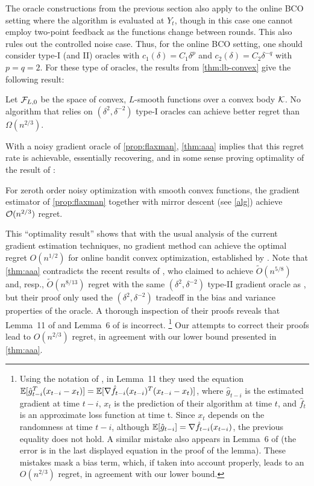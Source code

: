 The oracle constructions from the previous section also apply to the online BCO setting
where the algorithm is evaluated at $Y_t$, though in this case 
one cannot employ two-point feedback as the functions change between rounds. 
This also rules out the controlled noise case. 
Thus, for the online BCO setting, one should consider type-I (and II) oracles with $c_1(\delta) = C_1 \delta^p$ and $c_2(\delta) = C_2\delta^{-q}$ with $p=q=2$.
For these type of oracles, the results from \cref{thm:lb-convex} give the following result: 
\begin{theorem}\label{thm:aaa}
Let $\mathcal{F}_{L,0}$ be the space of convex, $L$-smooth functions over a convex body $\mathcal{K}$.
No algorithm that relies on 
 $(\delta^2,\delta^{-2})$ type-I oracles
 can achieve better regret than $\Omega(n^{2/3})$.
\end{theorem}
With a noisy gradient oracle of \cref{prop:flaxman}, \cref{thm:aaa} implies that this regret rate is achievable, essentially recovering, and in some sense proving optimality of the result of \citet{saha2011improved}:
\begin{theorem}
For zeroth order noisy optimization with smooth convex functions, the gradient estimator of \cref{prop:flaxman} together with mirror descent (see \cref{alg}) achieve $\mathcal{O}(n^{2/3})$ regret.
\end{theorem}
This ``optimality result'' shows that with the usual analysis of the current gradient estimation techniques, no gradient method can achieve the optimal regret $O(n^{1/2})$ for online bandit convex optimization, established by \citet{BubeckDKP15,BuEl15}. Note that \cref{thm:aaa} contradicts the recent results of \citet{DeElKo15,YaMo16}, who claimed to achieve $\tilde{O}(n^{5/8})$ and, resp., $\tilde{O}(n^{8/13})$ regret with the same $(\delta^2,\delta^{-2})$ type-II gradient oracle as \citet{saha2011improved}, but their proof only used the $(\delta^2,\delta^{-2})$ tradeoff in the bias and variance properties of the oracle.
A thorough inspection of their proofs reveals that Lemma~11 of \citet{DeElKo15} and Lemma~6 of \citet{YaMo16} is incorrect.%
\footnote{Using the notation of \citet{DeElKo15}, in Lemma~11 they used the equation $\mathbb{E}[\hat{g}_{t-i}^T(x_{t-i} - x_t)] = \mathbb{E}[\nabla \hat{f}_{t-i} (x_{t-i})^T(x_{t-i} - x_t)]$, where $\hat{g}_{t-i}$ is the estimated gradient at time $t-i$, $x_t$ is the prediction of their algorithm at time $t$, and $\hat{f}_t$ is an approximate loss function at time t. Since $x_t$ depends on the randomness at time $t-i$, although $\mathbb{E}[\hat{g}_{t-i}] = \nabla \hat{f}_{t-i} (x_{t-i})$, the previous equality does not hold. A similar mistake also appears in Lemma~6 of \citet{YaMo16} (the error is in the last displayed equation in the proof of the lemma). These mistakes mask a bias term, which, if taken into account properly, leads to an $O(n^{2/3})$ regret, in agreement with our lower bound.}
Our attempts to correct their proofs lead to $O(n^{2/3})$ regret, in agreement with our lower bound presented in \cref{thm:aaa}.






